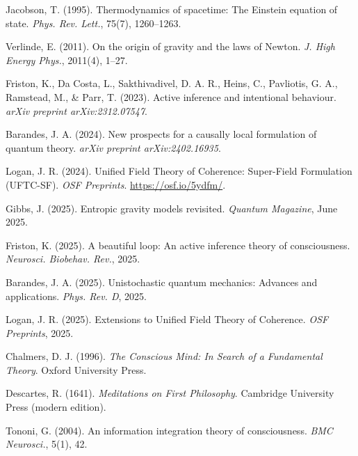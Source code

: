 \documentclass[12pt]{book}
\theoremstyle{definition}
\begin{document}

\begin{thebibliography}{10}

Jacobson, T. (1995).
Thermodynamics of spacetime: The Einstein equation of state.
\emph{Phys. Rev. Lett.}, 75(7), 1260--1263.

Verlinde, E. (2011).
On the origin of gravity and the laws of Newton.
\emph{J. High Energy Phys.}, 2011(4), 1--27.

Friston, K., Da Costa, L., Sakthivadivel, D. A. R., Heins, C., Pavliotis, G. A., Ramstead, M., \& Parr, T. (2023).
Active inference and intentional behaviour.
\emph{arXiv preprint arXiv:2312.07547}.

Barandes, J. A. (2024).
New prospects for a causally local formulation of quantum theory.
\emph{arXiv preprint arXiv:2402.16935}.

Logan, J. R. (2024).
Unified Field Theory of Coherence: Super-Field Formulation (UFTC-SF).
\emph{OSF Preprints}.
\url{https://osf.io/5ydfm/}.

Gibbs, J. (2025).
Entropic gravity models revisited.
\emph{Quantum Magazine}, June 2025.

Friston, K. (2025).
A beautiful loop: An active inference theory of consciousness.
\emph{Neurosci. Biobehav. Rev.}, 2025.

Barandes, J. A. (2025).
Unistochastic quantum mechanics: Advances and applications.
\emph{Phys. Rev. D}, 2025.

Logan, J. R. (2025).
Extensions to Unified Field Theory of Coherence.
\emph{OSF Preprints}, 2025.

Chalmers, D. J. (1996).
\emph{The Conscious Mind: In Search of a Fundamental Theory}.
Oxford University Press.

Descartes, R. (1641).
\emph{Meditations on First Philosophy}.
Cambridge University Press (modern edition).

Tononi, G. (2004).
An information integration theory of consciousness.
\emph{BMC Neurosci.}, 5(1), 42.

\end{thebibliography}
\end{document}
